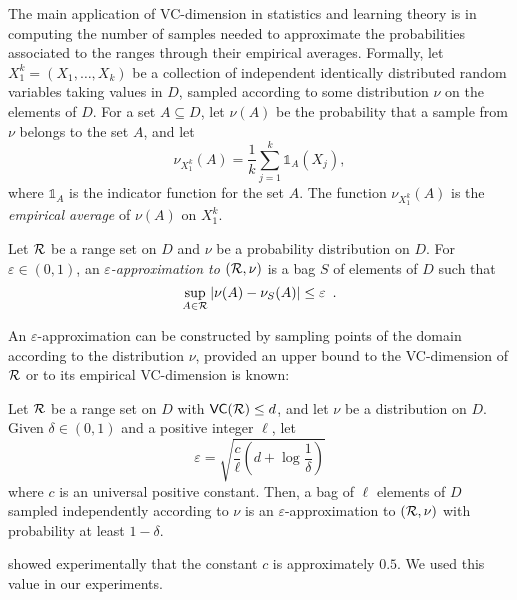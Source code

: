 The main application of VC-dimension in statistics and learning
theory is in computing the number of samples needed to approximate the
probabilities associated to the ranges through their empirical averages.
Formally, let $X_1^k=(X_1,\dotsc,X_k)$ be a collection of independent
identically distributed random variables taking values in $D$, sampled 
according to some distribution $\nu$ on the elements of $D$.
For a set $A\subseteq D$, let $\nu(A)$ be the probability that a sample from
$\nu$ belongs to the set $A$, and let
\[
\nu_{X_1^k}(A)=\frac{1}{k}\sum_{j=1}^k\mathds{1}_A(X_j),\]
where $\mathds{1}_A$ is the indicator function for the set $A$. The function
$\nu_{X_1^k}(A)$ is the \emph{empirical average} of $\nu(A)$ on $X_1^k$.

\begin{definition}\label{def:eapprox}
  Let $\mathcal{R}$ be a range set on %
  $D$ and $\nu$ be a probability distribution on $D$. For $\varepsilon\in(0,1)$,
  an \emph{$\varepsilon$-approximation to $(\mathcal{R},\nu)$} is a bag $S$ of
  elements of $D$ such that 
  \[
  \sup_{A\in\mathcal{R}}|\nu(A)-\nu_S(A)|\le\varepsilon\enspace.\]
\end{definition}

An $\varepsilon$-approximation can be constructed by sampling points of
the domain according to the distribution $\nu$, provided an upper bound to the
VC-dimension of $\mathcal{R}$ or to its empirical VC-dimension is known:

\begin{theorem}\label{thm:eapprox}
  Let $\mathcal{R}$ be a range set on %
  $D$ with $\mathsf{VC}(\mathcal{R})\le d$, and let $\nu$ be a distribution on $D$. Given
  $\delta\in(0,1)$ and a positive integer $\ell$, let
  \begin{equation}\label{eq:vceapprox}
    \varepsilon = \sqrt{\frac{c}{\ell}\left(d + \log\frac{1}{\delta}\right)}
  \end{equation}
  where $c$ is an universal positive constant. Then, a bag of $\ell$
  elements of $D$ sampled independently according to $\nu$ is an
  $\varepsilon$-approximation to $(\mathcal{R},\nu)$ with probability at least
  $1-\delta$.
\end{theorem}
\citet{LofflerP09} showed experimentally that the constant $c$ is approximately
$0.5$. We used this value in our experiments.

